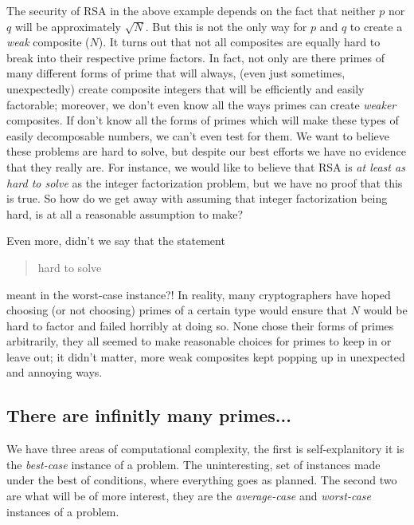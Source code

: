The security of RSA in the above example depends on the fact that neither $p$ nor $q$ will be approximately $\sqrt{N}$. But this is not the only way for $p$ and $q$ to create a \emph{weak} composite ($N$). It turns out that not all composites are equally hard to break into their respective prime factors. In fact, not only are there primes of many different forms of prime that will always, (even just sometimes, unexpectedly) create composite integers that will be efficiently and easily factorable; moreover, we don't even know all the ways primes can create \emph{weaker} composites. If don't know all the forms of primes which will make these types of easily decomposable numbers, we can't even test for them. We want to believe these problems are hard to solve, but despite our best efforts we have no evidence that they really are. For instance, we would like to believe that RSA is \emph{at least as hard to solve} as the integer factorization problem, but we have no proof that this is true. 
\newline
So how do we get away with assuming that integer factorization being hard, is at all a reasonable assumption to make?
\medskip

Even more, didn't we say that the statement \begin{quotation} hard to solve \end{quotation} meant in the worst-case instance?!
\newline
In reality, many cryptographers have hoped choosing (or not choosing) primes of a certain type would ensure that $N$ would be hard to factor and failed horribly at doing so. None chose their forms of primes arbitrarily, they all seemed to make reasonable choices for primes to keep in or leave out; it didn't matter, more weak composites kept popping up in unexpected and annoying ways. 
\newline

\subsection*{There are infinitly many primes...}

We have three areas of computational complexity, the first is self-explanitory it is the \emph{best-case} instance of a problem. The uninteresting, set of instances made under the best of conditions, where everything goes as planned. The second two are what will be of more interest, they are the \emph{average-case} and \emph{worst-case} instances of a problem. 
\bigskip
    
